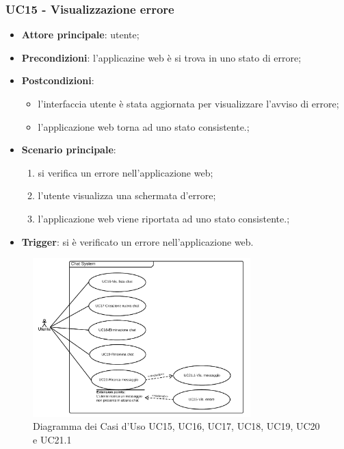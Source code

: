 \documentclass[10pt, a4paper]{article}
\begin{document}
    \subsubsection{UC15 - Visualizzazione errore}
    \begin{itemize}
        \item \textbf{Attore principale}: utente;
        \item \textbf{Precondizioni}: l'applicazine web è si trova in uno stato di errore;
        \item \textbf{Postcondizioni}:
        \begin{itemize}
            \item l'interfaccia utente è stata aggiornata per visualizzare l'avviso di errore;
            \item l'applicazione web torna ad uno stato consistente.;
        \end{itemize} 
        \item \textbf{Scenario principale}:
            \begin{enumerate}
                \item si verifica un errore nell'applicazione web;
                \item l'utente visualizza una schermata d'errore;
                \item l'applicazione web viene riportata ad uno stato consistente.;
            \end{enumerate}
        \item \textbf{Trigger}: si è verificato un errore nell'applicazione web.
    \end{itemize}
    
    \begin{figure}[h]
        \centering
        \includegraphics[width=0.75\textwidth, height=0.75\textheight, keepaspectratio]{UC-images/UC15-UC16-UC17-UC18-UC19-UC20-UC21.1.png}
        \caption{Diagramma dei Casi d'Uso UC15, UC16, UC17, UC18, UC19, UC20 e UC21.1}
    \end{figure}
    
\end{document}
